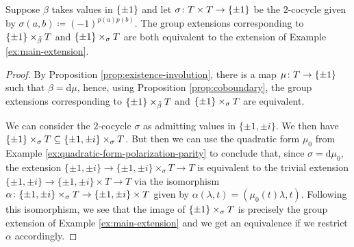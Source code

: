 \begin{lemma}\label{lemma:tildeT-finally}
	Suppose $\beta$ takes values in $\{ \pm 1 \}$ and let $\sigma\colon T\times T \to \{ \pm 1 \}$ be the $2$-cocycle given by $\sigma(a,b) \coloneqq (-1)^{p(a)p(b)}$.
	The group extensions corresponding to $\{ \pm 1 \} \times_{\tilde\beta} T$ and $\{ \pm 1 \} \times_\sigma T$ are both equivalent to the extension of Example
	\ref{ex:main-extension}.
\end{lemma}

\begin{proof}
	By Proposition \ref{prop:existence-involution}, there is a map $\mu\colon T \to \{\pm 1\}$ such that $\beta = \mathrm{d}\mu$, hence, using Proposition \ref{prop:coboundary}, the group extensions corresponding to $\{ \pm 1 \} \times_{\tilde\beta} T$ and $\{ \pm 1 \} \times_\sigma T$ are equivalent.

	We can consider the $2$-cocycle $\sigma$ as admitting values in $\{\pm 1, \pm i\}$.
	We then have $\{ \pm 1 \} \times_\sigma T \subseteq \{\pm 1, \pm i\} \times_\sigma T$.
	But then we can use the quadratic form $\mu_0$ from Example \ref{ex:quadratic-form-polarization-parity} to conclude that, since $\sigma = \mathrm{d} \mu_0$, the extension $\{\pm 1, \pm i\} \to \{\pm 1, \pm i\} \times_\sigma T \to T$ is equivalent to the trivial extension $\{\pm 1, \pm i\} \to \{\pm 1, \pm i\} \times T \to T$ via the isomorphism $\alpha\colon \{\pm 1, \pm i\} \times_\sigma T \to \{\pm 1, \pm i\} \times T$ given by $\alpha(\lambda, t) = (\mu_0(t) \lambda, t)$.
	Following this isomorphism, we see that the image of $\{ \pm 1 \} \times_\sigma T$ is precisely the group extension of Example \ref{ex:main-extension} and we get an equivalence if we restrict $\alpha$ accordingly.
\end{proof}



